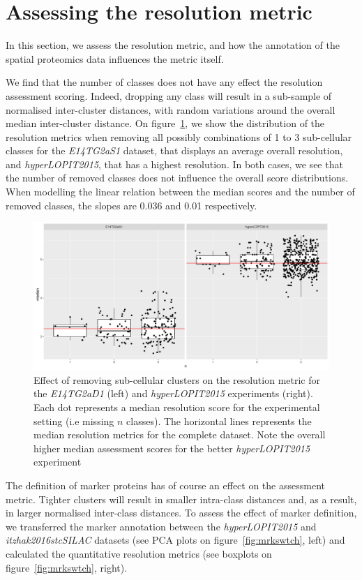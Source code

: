 \documentclass[12pt]{article}\usepackage[]{graphicx}\usepackage[]{color}
\begin{document}
\clearpage

\section{Assessing the resolution metric}\label{sec:qsepassess}

In this section, we assess the resolution metric, and how the
annotation of the spatial proteomics data influences the metric
itself.



We find that the number of classes does not have any effect the resolution
assessment scoring. Indeed, dropping any class will result in a
sub-sample of normalised inter-cluster distances, with random
variations around the overall median inter-cluster distance. On
figure~\ref{fig:simn}, we show the distribution of the resolution
metrics when removing all possibly combinations of 1 to 3 sub-cellular
classes for the \textit{E14TG2aS1} dataset, that displays an average
overall resolution, and \textit{hyperLOPIT2015}, that has a highest
resolution. In both cases, we see that the number of removed classes
does not influence the overall score distributions. When modelling the
linear relation between the median scores and the number of removed
classes, the slopes are 0.036 and
0.01 respectively.

\begin{figure}[h]
  \centering
  \includegraphics[width = .7\textwidth]{simn.pdf}
  \caption{Effect of removing sub-cellular clusters on the resolution
    metric for the \textit{E14TG2aD1} (left) and
    \textit{hyperLOPIT2015} experiments (right). Each dot represents a
    median resolution score for the experimental setting (i.e missing
    $n$ classes). The horizontal lines represents the median resolution
    metrics for the complete dataset. Note the overall higher median
    assessment scores for the better \textit{hyperLOPIT2015}
    experiment }
  \label{fig:simn}
\end{figure}

The definition of marker proteins has of course an effect on the
assessment metric. Tighter clusters will result in smaller intra-class
distances and, as a result, in larger normalised inter-class
distances. To assess the effect of marker definition, we transferred
the marker annotation between the \textit{hyperLOPIT2015} and
\textit{itzhak2016stcSILAC} datasets (see PCA plots on
figure~\ref{fig:mrkswtch}, left) and calculated the quantitative
resolution metrics (see boxplots on figure~\ref{fig:mrkswtch},
right).
\end{document}
